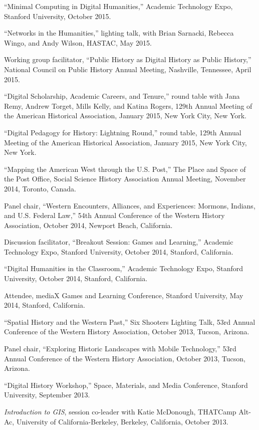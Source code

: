 ``Minimal Computing in Digital Humanities,'' Academic Technology Expo,
Stanford University, October 2015.

``Networks in the Humanities,'' lighting talk, with Brian Sarnacki,
Rebecca Wingo, and Andy Wilson, HASTAC, May 2015.

Working group facilitator, ``Public History as Digital History as Public
History,'' National Council on Public History Annual Meeting, Nashville,
Tennessee, April 2015.

``Digital Scholarship, Academic Careers, and Tenure,'' round table with
Jana Remy, Andrew Torget, Mills Kelly, and Katina Rogers, 129th Annual
Meeting of the American Historical Association, January 2015, New York
City, New York.

``Digital Pedagogy for History: Lightning Round,'' round table, 129th
Annual Meeting of the American Historical Association, January 2015, New
York City, New York.

``Mapping the American West through the U.S. Post,'' The Place and Space
of the Post Office, Social Science History Association Annual Meeting,
November 2014, Toronto, Canada.

Panel chair, ``Western Encounters, Alliances, and Experiences: Mormons,
Indians, and U.S. Federal Law,'' 54th Annual Conference of the Western
History Association, October 2014, Newport Beach, California.

Discussion facilitator, ``Breakout Session: Games and Learning,''
Academic Technology Expo, Stanford University, October 2014, Stanford,
California.

``Digital Humanities in the Classroom,'' Academic Technology Expo,
Stanford University, October 2014, Stanford, California.

Attendee, mediaX Games and Learning Conference, Stanford University, May
2014, Stanford, California.

``Spatial History and the Western Past,'' Six Shooters Lighting Talk,
53rd Annual Conference of the Western History Association, October 2013,
Tucson, Arizona.

Panel chair, ``Exploring Historic Landscapes with Mobile Technology,''
53rd Annual Conference of the Western History Association, October 2013,
Tucson, Arizona.

``Digital History Workshop,'' Space, Materials, and Media Conference,
Stanford University, September 2013.

\emph{Introduction to GIS}, session co-leader with Katie McDonough,
THATCamp Alt-Ac, University of California-Berkeley, Berkeley,
California, October 2013.

